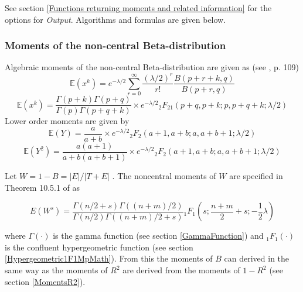 \vspace{0.3cm}

See section \ref{Functions returning moments and related information} for the options for {\itshape\sffamily Output}. Algorithms and formulas are given below.

\subsubsection{Moments of the non-central Beta-distribution}


\label{Special case: moments of the non-central Beta-distribution}
Algebraic moments of the non-central Beta-distribution are given  as (see \cite{walck_2007}, p. 109)
\begin{equation}
	\mathbb{E}(x^k) = e^{-\lambda/2} \sum_{r=0}^{\infty} \frac{(\lambda/2)^r}{r!} \frac{B(p+r+k,q)}{B(p+r,q)}
\end{equation}
\begin{equation}
	\mathbb{E}(x^k) = \frac{\Gamma(p+k) \Gamma(p+q)}{\Gamma(p) \Gamma(p+q+k)} \times e^{-\lambda/2}  {}_2F_21(p+q,p+k;p,p+q+k;\lambda/2)
\end{equation}
Lower order moments are given by
\begin{equation}
	\mathbb{E}(Y) = \frac{a}{a+b} \times e^{-\lambda/2}  {}_2F_2(a+1,a+b;a,a+b+1;\lambda/2)
\end{equation}
\begin{equation}
	\mathbb{E}(Y^2) = \frac{a(a+1)}{a+b(a+b+1)} \times e^{-\lambda/2}  {}_2F_2(a+1,a+b;a,a+b+1;\lambda/2)
\end{equation}

Let $W = 1-B = | E | / | T + E |$ . The noncentral moments of $W$ are specified in Theorem 10.5.1 of \cite{Muirhead_1982} as

\begin{equation}
	E(W^s) = \frac{\Gamma(n/2 + s)\Gamma((n + m)/2)}{\Gamma(n/2)\Gamma((n + m)/2 + s)} {}_1F_1\left(s ;\frac{n + m}{2}+ s ; -\frac{1}{2}\lambda\right)
\end{equation}

where $\Gamma(\cdot)$ is the gamma function (see section \ref{GammaFunction}) and ${}_1F_1(\cdot)$ is the confluent hypergeometric function (see section \ref{Hypergeometric1F1MpMath}). 
From this the moments of $B$ can derived in the same way as the moments of $R^2$ are derived from the moments of $1-R^2$ (see section \ref{MomentsR2}).





